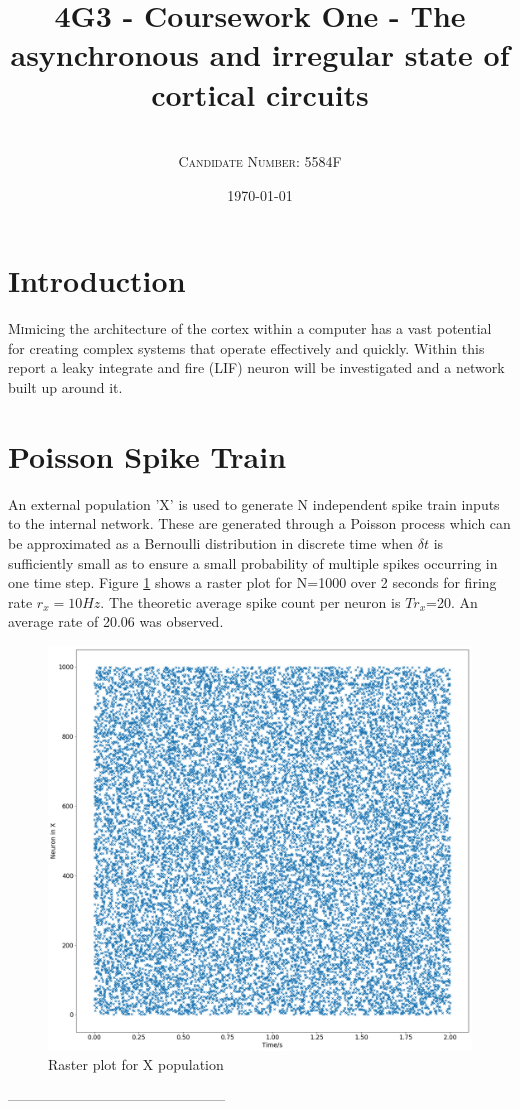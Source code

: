 \documentclass[twoside,twocolumn]{article}
\title{4G3 - Coursework One -  The asynchronous and irregular state of cortical circuits} %
\author{%
\\
\textsc{Candidate Number: 5584F} \\
}
\date{\today} %
\begin{document}
\onecolumn

\twocolumn
{}
\maketitle
\section{Introduction}

\lettrine[nindent=0em,lines=3]{M}imicing the architecture of the cortex within a computer has a vast potential for creating complex systems that operate effectively and quickly. Within this report a leaky integrate and fire (LIF) neuron will be investigated and a network built up around it.


\section{Poisson Spike Train}
An external population 'X' is used to generate N independent spike train inputs to the internal network. These are generated through a Poisson process which can be approximated as a Bernoulli distribution in discrete time when $\delta t$ is sufficiently small  as to ensure a small probability of multiple spikes occurring in one time step. Figure \ref{fig:raster} shows a raster plot for N=1000 over 2 seconds for firing rate $r_x=10Hz$. The theoretic average spike count per neuron is $Tr_x$=20. An average rate of 20.06 was observed.

\begin{figure}[h]
  \centering
    \includegraphics[width=\linewidth]{raster}
  \caption{Raster plot for X population}
  \label{fig:raster}
\end{figure}
 -----------------------------------------------
\end{document}
